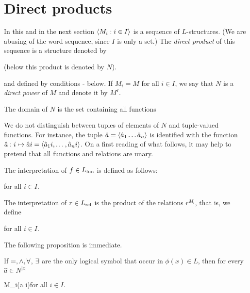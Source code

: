 \documentclass[creche.tex]{subfiles}
\begin{document}
\section{Direct products}
\label{prodottidiretti}

In this and in the next section $\langle M_i:i\in I\rangle$ is a sequence of $L$-structures. (We are abusing of the word sequence, since $I$ is only a set.) The \emph{direct product\/} of this sequence is a structure denoted by

\hfill (below this product is denoted by  \emph{$N$\/}).\bigskip

and defined by conditions - below. If $M_i=M$ for all $i\in I$, we say that $N$ is a \emph{direct power\/} of $M$ and denote it by \emph{$M^I$}.

The domain of $N$ is the set containing all functions

\smallskip


We do not distinguish between tuples of elements of $N$ and tuple-valued functions. For instance, the tuple $\hat a=\langle\hat a_1\dots\hat a_n\rangle$ is identified with the function $\hat a:i\mapsto\hat ai=\langle\hat a_1i,\dots,\hat a_ni\rangle$. On a first reading of what follows, it may help to pretend that all functions and relations are unary.

The interpretation of $f\in L_{\rm fun}$ is defined as follows:

\hfill  for all $i\in I$.

The interpretation of $r\in L_{\rm rel}$ is the product of the relations $r^{M_i}$, that is, we define

\hfill  for all $i\in I$.


The following proposition is immediate.

\begin{proposition}\label{proposizioneprodottidiretti}
If $=, \wedge, \forall$, $\exists$ are the only logical symbol that occur in $\phi(x)\in L$, then for every $\hat a\in N^{|x|}$

{\IFF}
{M_i\models\phi(\hat a i)}\hfill for all $i\in I$.

\end{proposition}
\end{document}
